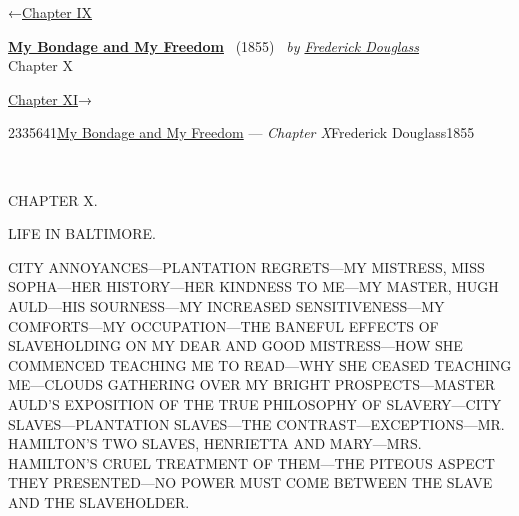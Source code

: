 \hypertarget{headerContainer}{}
\hypertarget{navigationHeader}{}
\protect\hypertarget{headerprevious}{}{←\href{/wiki/My_Bondage_and_My_Freedom_(1855)/Chapter_IX}{Chapter
IX}}

\textbf{\protect\hypertarget{header_title_text}{}{\href{/wiki/My_Bondage_and_My_Freedom_(1855)}{My
Bondage and My Freedom}}} ~(1855)~ \emph{by
\href{/wiki/Author:Frederick_Douglass}{\protect\hypertarget{header_author_text}{}{{Frederick
Douglass}}}}\\
\protect\hypertarget{header_section_text}{}{Chapter X}

\protect\hypertarget{headernext}{}{\href{/wiki/My_Bondage_and_My_Freedom_(1855)/Chapter_XI}{Chapter
XI}→}

\hypertarget{navigationNotes}{}

\hypertarget{ws-data}{}
\protect\hypertarget{ws-article-id}{}{2335641}\protect\hypertarget{ws-title}{}{\href{/wiki/My_Bondage_and_My_Freedom_(1855)}{My
Bondage and My Freedom} --- \emph{Chapter
X}}\protect\hypertarget{ws-author}{}{Frederick
Douglass}\protect\hypertarget{ws-year}{}{1855}

{\protect\hypertarget{141}{}{}}

~

{CHAPTER X.}

LIFE IN BALTIMORE.

{CITY ANNOYANCES---PLANTATION REGRETS---MY MISTRESS, MISS SOPHA---HER
HISTORY---HER KINDNESS TO ME---MY MASTER, HUGH AULD---HIS SOURNESS---MY
INCREASED SENSITIVENESS---MY COMFORTS---MY OCCUPATION---THE BANEFUL
EFFECTS OF SLAVEHOLDING ON MY DEAR AND GOOD MISTRESS---HOW SHE COMMENCED
TEACHING ME TO READ---WHY SHE CEASED TEACHING ME---CLOUDS GATHERING OVER
MY BRIGHT PROSPECTS---MASTER AULD'S EXPOSITION OF THE TRUE PHILOSOPHY OF
SLAVERY---CITY SLAVES---PLANTATION SLAVES---THE
CONTRAST---EXCEPTIONS---MR. HAMILTON'S TWO SLAVES, HENRIETTA AND
MARY---MRS. HAMILTON'S CRUEL TREATMENT OF THEM---THE PITEOUS ASPECT THEY
PRESENTED---NO POWER MUST COME BETWEEN THE SLAVE AND THE SLAVEHOLDER.}


